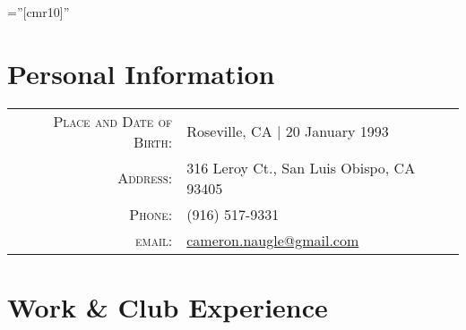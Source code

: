 \documentclass[10pt]{article} %
\begin{document}
\thispagestyle{empty} %

\font\fb=''[cmr10]'' %
\setlength{\linewidth}{6.5in}
\setlength{\hsize}{6.5in}

\par{\bigskip\par} %

\section{Personal Information}

\begin{tabular}{rl}
	\textsc{Place and Date of Birth:} & Roseville, CA  | 20 January 1993 \\
	\textsc{Address:} & 316 Leroy Ct., San Luis Obispo, CA 93405 \\
	\textsc{Phone:} &  (916) 517-9331\\
	\textsc{email:} & \href{mailto:cameron.naugle@gmail.com}{cameron.naugle@gmail.com}
\end{tabular}


\section{Work \& Club Experience}
\end{document}
